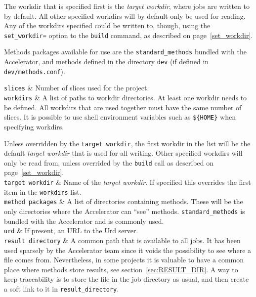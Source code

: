 The workdir that is specified first is the \textsl{target workdir},
where jobs are written to by default.  All other specified workdirs
will by default only be used for reading.  Any of the workdirs
specified could be written to, though, using the
\texttt{set\_workdir=} option to the \texttt{build} command, as
described on page~\ref{set_workdir}.

Methods packages available for use are the \texttt{standard\_methods} bundled
with the Accelerator, and methods defined in the
directory \texttt{dev} (if defined in \texttt{dev/methods.conf}).

\starttabletwo

\RPtwo \texttt{slices} & Number of slices used for the project.\\[1ex]

\RPtwo \texttt{workdirs} & A list of paths to workdir directories.  At
least one workdir needs to be defined.  All workdirs that are used
together must have the same number of slices.  It is possible to use
shell environment variables such as \texttt{\$\{HOME\}} when
specifying workdirs.

Unless overridden by the \texttt{target workdir}, the first workdir in
the list will be the default \textsl{target workdir} that is used for
all writing.  Other specified workdirs will only be read from, unless
overrided by the \texttt{build} call as described on
page~\ref{set_workdir}.\\[1ex]

\RPtwo \texttt{target workdir} & Name of the \textsl{target workdir}.
If specified this overrides the first item in the \texttt{workdirs}
list.\\[1ex]

\RPtwo \texttt{method packages} & A list of directories containing
methods.  These will be the only directories where the Accelerator can
``see'' methods.  \texttt{standard\_methods} is bundled with the
Accelerator and is commonly used.\\[1ex]

\RPtwo \texttt{urd} & If present, an URL to the Urd server.\\[1ex]

\RPtwo \texttt{result directory} & A common path that is available to
all jobs.  It has been used sparsely by the Accelerator team since it
voids the possibility to see where a file comes from.  Nevertheless,
in some projects it is valuable to have a common place where methods
store results, see section~\ref{sec:RESULT_DIR}.  A way to keep
traceability is to store the file in the job directory as usual, and
then create a soft link to it in \texttt{result\_directory}.\\[1ex]

